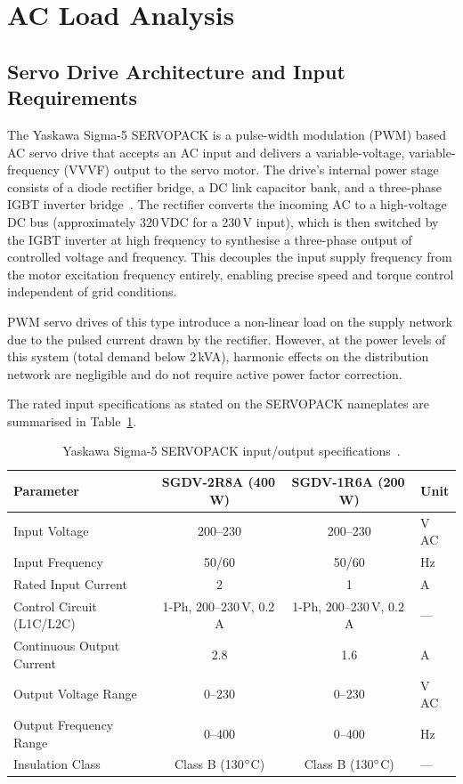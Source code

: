 \section{AC Load Analysis}

\subsection{Servo Drive Architecture and Input Requirements}

The Yaskawa Sigma-5 SERVOPACK is a pulse-width modulation (PWM) based AC servo drive that accepts an AC input and delivers a variable-voltage, variable-frequency (VVVF) output to the servo motor. The drive's internal power stage consists of a diode rectifier bridge, a DC link capacitor bank, and a three-phase IGBT inverter bridge~\cite{yaskawa_manual}. The rectifier converts the incoming AC to a high-voltage DC bus (approximately 320\,VDC for a 230\,V input), which is then switched by the IGBT inverter at high frequency to synthesise a three-phase output of controlled voltage and frequency. This decouples the input supply frequency from the motor excitation frequency entirely, enabling precise speed and torque control independent of grid conditions.

PWM servo drives of this type introduce a non-linear load on the supply network due to the pulsed current drawn by the rectifier. However, at the power levels of this system (total demand below 2\,kVA), harmonic effects on the distribution network are negligible and do not require active power factor correction.

The rated input specifications as stated on the SERVOPACK nameplates are summarised in Table~\ref{tab:servopack_specs}.

\begin{table}[H]
    \centering
    \caption{Yaskawa Sigma-5 SERVOPACK input/output specifications~\cite{yaskawa_manual}.}
    \label{tab:servopack_specs}
    \renewcommand{\arraystretch}{1.2}
    \begin{tabular}{@{}lccl@{}}
        \toprule
        \textbf{Parameter} & \textbf{SGDV-2R8A (400\,W)} & \textbf{SGDV-1R6A (200\,W)} & \textbf{Unit} \\
        \midrule
        Input Voltage & 200--230 & 200--230 & V\,AC \\
        Input Frequency & 50/60 & 50/60 & Hz \\
        Rated Input Current & 2 & 1 & A \\
        Control Circuit (L1C/L2C) & 1-Ph, 200--230\,V, 0.2\,A & 1-Ph, 200--230\,V, 0.2\,A & --- \\
        Continuous Output Current & 2.8 & 1.6 & A \\
        Output Voltage Range & 0--230 & 0--230 & V\,AC \\
        Output Frequency Range & 0--400 & 0--400 & Hz \\
        Insulation Class & Class B (130$\degree$C) & Class B (130$\degree$C) & --- \\
        \bottomrule
    \end{tabular}
\end{table}

